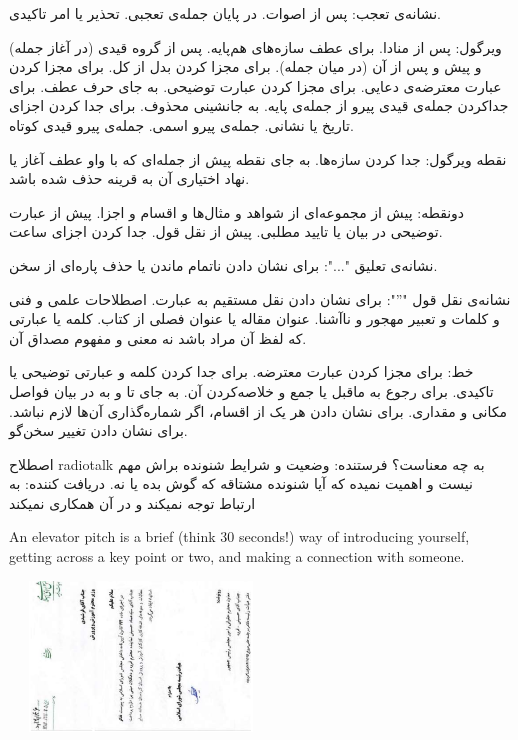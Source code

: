 \documentclass[10pt,landscape]{article}
\makeatletter
\renewcommand{\section}{\@startsection{section}{1}{0mm}%
                                {-1ex plus -.5ex minus -.2ex}%
                                {0.5ex plus .2ex}%
                                {\normalfont\large\bfseries}}
\makeatother
\begin{document}
\begin{multicols*}{3}
{    نشانه‌ی تعجب:
    پس از اصوات.
    در پایان جمله‌ی تعجبی.
    تحذیر یا امر تاکیدی.

    ویرگول:
    پس از منادا.
    برای عطف سازه‌های هم‌پایه.
    پس از گروه قیدی
    (در آغاز جمله)
    و پیش و پس از آن
    (در میان جمله).
    برای مجزا کردن بدل از کل.
    برای مجزا کردن عبارت معترضه‌ی دعایی.
    برای مجزا کردن عبارت توضیحی.
    به جای حرف عطف.
    برای جداکردن جمله‌ی قیدی پیرو از جمله‌ی پایه.
    به جانشینی محذوف.
    برای جدا کردن اجزای تاریخ یا نشانی.
    جمله‌ی پیرو اسمی.
    جمله‌ی پیرو قیدی کوتاه.

    نقطه ویرگول:
    جدا کردن سازه‌ها.
    به جای نقطه پیش از جمله‌ای که با واو عطف آغاز یا نهاد اختیاری آن به قرینه حذف شده باشد.

    دونقطه:
    پیش از مجموعه‌ای از شواهد و مثال‌ها و اقسام و اجزا.
    پیش از عبارت توضیحی در بیان یا تایید مطلبی.
    پیش از نقل قول.
    جدا کردن اجزای ساعت.

    نشانه‌ی تعلیق "...":
    برای نشان دادن ناتمام ماندن یا حذف پاره‌ای از سخن.

    نشانه‌ی نقل قول
    "''":
    برای نشان دادن نقل مستقیم به عبارت.
    اصطلاحات علمی و فنی و کلمات و تعبیر مهجور و ناآشنا.
    عنوان مقاله یا عنوان فصلی از کتاب.
    کلمه یا عبارتی که لفظ آن مراد باشد نه معنی و مفهوم مصداق آن.

    خط:
    برای مجزا کردن عبارت معترضه.
    برای جدا کردن کلمه و عبارتی توضیحی یا تاکیدی.
    برای رجوع به ماقبل یا جمع و خلاصه‌کردن آن.
    به جای تا و به در بیان فواصل مکانی و مقداری.
    برای نشان دادن هر یک از اقسام، اگر شماره‌گذاری آن‌ها لازم نباشد.
    برای نشان دادن تغییر سخن‌گو.

    اصطلاح
radiotalk
به چه معناست؟
فرستنده: وضعیت و شرایط شنونده براش مهم نیست و اهمیت نمیده که
آیا شنونده مشتاقه که گوش بده یا نه.
دریافت کننده: به ارتباط توجه نمیکند و در آن همکاری نمیکند


    
}

\raggedright

An elevator pitch is a brief (think 30 seconds!)
 way of introducing yourself, getting across a
  key point or two, and making a connection with someone. 

\includegraphics[width=7cm, height=4cm]{letter}



\end{multicols*}
\end{document}
